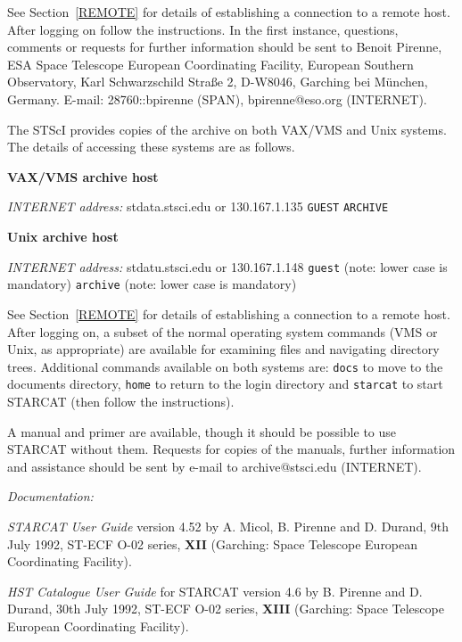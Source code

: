 See Section~\ref{REMOTE} for details of establishing a connection to
a remote host. After logging on follow the instructions. In the first 
instance, questions, comments or requests for further information should
be sent to Benoit Pirenne, ESA Space Telescope European Coordinating
Facility, European Southern Observatory, Karl Schwarzschild Stra\ss e 2,
D-W8046, Garching bei M\"{u}nchen, Germany. E-mail: 28760::bpirenne 
(SPAN), bpirenne@eso.org (INTERNET).

The STScI provides copies of the archive on both VAX/VMS and Unix 
systems. The details of accessing these systems are as follows.

{\bf VAX/VMS archive host}

{\it INTERNET address:} stdata.stsci.edu or 130.167.1.135
 \verb-GUEST-
 \verb-ARCHIVE-

{\bf Unix archive host}

{\it INTERNET address:} stdatu.stsci.edu or 130.167.1.148
 \verb-guest- (note: lower case is mandatory) 
 \verb-archive- (note: lower case is mandatory) 

See Section~\ref{REMOTE} for details of establishing a connection to
a remote host. After logging on, a subset of the normal operating system
commands (VMS or Unix, as appropriate) are available for examining files
and navigating directory trees. Additional commands available on both
systems are: \verb-docs- to move to the documents directory, \verb-home-
to return to the login directory and \verb-starcat- to start STARCAT 
(then follow the instructions).

A manual and primer are available, though it should be possible to use
STARCAT without them. Requests for copies of the manuals, further 
information and assistance should be sent by e-mail to archive@stsci.edu
(INTERNET).

{\it Documentation:}

{\it STARCAT User Guide} version 4.52 by A. Micol, B. Pirenne and
D. Durand, 9th July 1992, ST-ECF O-02 series, {\bf XII} (Garching:
Space Telescope European Coordinating Facility).

{\it HST Catalogue User Guide} for STARCAT version 4.6 by B. Pirenne and
D. Durand, 30th July 1992, ST-ECF O-02 series, {\bf XIII} (Garching:
Space Telescope European Coordinating Facility).


